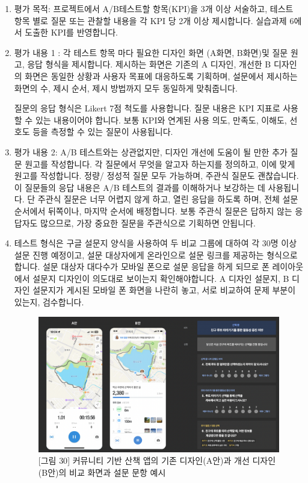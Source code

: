 \documentclass[
  letterpaper,
]{book}
\begin{document}
\begin{enumerate}
\def\labelenumi{\arabic{enumi}.}
\item
  평가 목적: 프로젝트에서 A/B테스트할 항목(KPI)을 3개 이상 서술하고,
  테스트 항목 별로 질문 또는 관찰할 내용을 각 KPI 당 2개 이상
  제시합니다. 실습과제 6에서 도출한 KPI를 반영합니다.
\item
  평가 내용 1 : 각 테스트 항목 마다 필요한 디자인 화면 (A화면, B화면)및
  질문 원고, 응답 형식을 제시합니다. 제시하는 화면은 기존의 A 디자인,
  개선한 B 디자인의 화면은 동일한 상황과 사용자 목표에 대응하도록
  기획하며, 설문에서 제시하는 화면의 수, 제시 순서, 제시 방법까지 모두
  동일하게 맞춰줍니다.

  질문의 응답 형식은 Likert 7점 척도를 사용합니다. 질문 내용은 KPI
  지표로 사용할 수 있는 내용이어야 합니다. 보통 KPI와 연계된 사용 의도,
  만족도, 이해도, 선호도 등을 측정할 수 있는 질문이 사용됩니다.
\item
  평가 내용 2: A/B 테스트와는 상관없지만, 디자인 개선에 도움이 될 만한
  추가 질문 원고를 작성합니다. 각 질문에서 무엇을 알고자 하는지를
  정의하고, 이에 맞게 원고를 작성합니다. 정량/ 정성적 질문 모두
  가능하며, 주관식 질문도 괜찮습니다. 이 질문들의 응답 내용은 A/B
  테스트의 결과를 이해하거나 보강하는 데 사용됩니다. 단 주관식 질문은
  너무 어렵지 않게 하고, 열린 응답을 하도록 하며, 전체 설문 순서에서
  뒤쪽이나, 마지막 순서에 배정합니다. 보통 주관식 질문은 답하지 않는
  응답자도 많으므로, 가장 중요한 질문을 주관식으로 기획하면 안됩니다.
\item
  테스트 형식은 구글 설문지 양식을 사용하여 두 비교 그룹에 대하여 각
  30명 이상 설문 진행 예정이고, 설문 대상자에게 온라인으로 설문 링크를
  제공하는 형식으로 합니다. 설문 대상자 대다수가 모바일 폰으로 설문
  응답을 하게 되므로 폰 레이아웃에서 설문지 디자인이 의도대로 보이는지
  확인해야합니다. A 디자인 설문지, B 디자인 설문지가 게시된 모바일 폰
  화면을 나란히 놓고, 서로 비교하여 문제 부분이 있는지, 검수합니다.

  \begin{figure}[H]

  {\centering \includegraphics{img/fig30.png}

  }

  \caption{{[}그림 30{]} 커뮤니티 기반 산책 앱의 기존 디자인(A안)과 개선
  디자인(B안)의 비교 화면과 설문 문항 예시}

  \end{figure}%
\end{enumerate}
\end{document}

